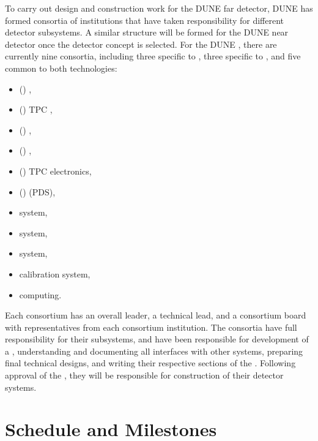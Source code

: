 To carry out design and construction work for the DUNE far detector, DUNE has  formed consortia of institutions that have taken responsibility for different detector subsystems. A similar structure will be formed for the DUNE near detector once the detector concept is selected. For the DUNE , there are currently nine consortia, including three specific to \single, three specific to \dual, and five common to both technologies:
\begin{itemize}
\item (\single) , %
\item (\single) TPC , %
\item (\single) , %
\item (\dual) , %
\item (\dual) TPC electronics, %
\item (\dual)  (PDS), %
\item {} system, %
\item {} system, %
\item {} system, %
\item calibration system,
\item computing.
\end{itemize} 
 Each consortium has an overall leader, a technical lead, and a consortium board with representatives from each consortium institution. The consortia have full responsibility for their subsystems, and have been responsible for development of a , understanding and documenting all interfaces with other systems, preparing final technical designs, and writing their respective sections of the . Following approval of the  , they will be responsible for construction of their detector systems. %


\section{Schedule and Milestones} 


